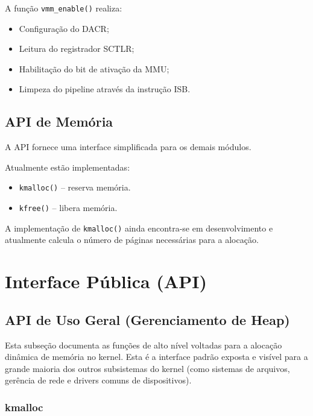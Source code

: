 A função \texttt{vmm\_enable()} realiza:

\begin{itemize}
\item Configuração do DACR;
\item Leitura do registrador SCTLR;
\item Habilitação do bit de ativação da MMU;
\item Limpeza do pipeline através da instrução ISB.
\end{itemize}

\subsection{API de Memória}

A API fornece uma interface simplificada para os demais módulos.

Atualmente estão implementadas:

\begin{itemize}
\item \texttt{kmalloc()} -- reserva memória.
\item \texttt{kfree()} -- libera memória.
\end{itemize}

A implementação de \texttt{kmalloc()} ainda encontra-se em desenvolvimento e atualmente calcula o número de páginas necessárias para a alocação.


\section{Interface Pública (API)}
%

\subsection{API de Uso Geral (Gerenciamento de Heap)}
Esta subseção documenta as funções de alto nível voltadas para a alocação dinâmica de memória no kernel. Esta é a interface padrão exposta e visível para a grande maioria dos outros subsistemas do kernel (como sistemas de arquivos, gerência de rede e drivers comuns de dispositivos).

\subsubsection{kmalloc}

